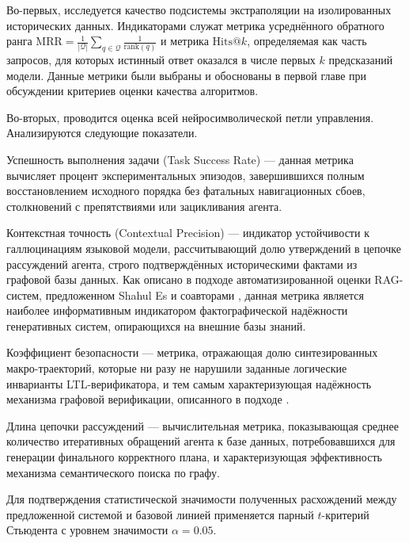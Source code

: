 Во-первых, исследуется качество подсистемы экстраполяции на изолированных исторических данных. Индикаторами служат метрика усреднённого обратного ранга $\displaystyle \text{MRR} = \frac{1}{|\mathcal{Q}|} \sum_{q \in \mathcal{Q}} \frac{1}{\text{rank}(q)}$ и метрика $\displaystyle \text{Hits@}k$, определяемая как часть запросов, для которых истинный ответ оказался в числе первых $\displaystyle k$ предсказаний модели. Данные метрики были выбраны и обоснованы в первой главе при обсуждении критериев оценки качества алгоритмов.

Во-вторых, проводится оценка всей нейросимволической петли управления. Анализируются следующие показатели.

Успешность выполнения задачи (Task Success Rate) — данная метрика вычисляет процент экспериментальных эпизодов, завершившихся полным восстановлением исходного порядка без фатальных навигационных сбоев, столкновений с препятствиями или зацикливания агента.

Контекстная точность (Contextual Precision) — индикатор устойчивости к галлюцинациям языковой модели, рассчитывающий долю утверждений в цепочке рассуждений агента, строго подтверждённых историческими фактами из графовой базы данных. Как описано в подходе автоматизированной оценки RAG-систем, предложенном Shahul Es и соавторами \cite{ref87}, данная метрика является наиболее информативным индикатором фактографической надёжности генеративных систем, опирающихся на внешние базы знаний.

Коэффициент безопасности — метрика, отражающая долю синтезированных макро-траекторий, которые ни разу не нарушили заданные логические инварианты LTL-верификатора, и тем самым характеризующая надёжность механизма графовой верификации, описанного в подходе \cite{ref8}.

Длина цепочки рассуждений — вычислительная метрика, показывающая среднее количество итеративных обращений агента к базе данных, потребовавшихся для генерации финального корректного плана, и характеризующая эффективность механизма семантического поиска по графу.

Для подтверждения статистической значимости полученных расхождений между предложенной системой и базовой линией применяется парный $\displaystyle t$-критерий Стьюдента с уровнем значимости $\displaystyle \alpha = 0.05$.


